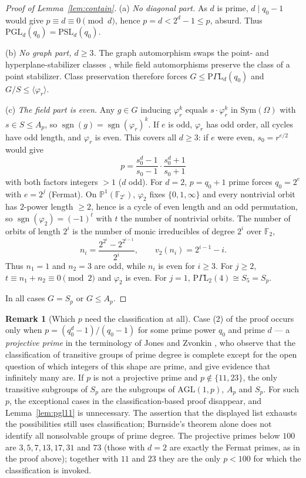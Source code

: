 \documentclass[11pt,a4paper]{amsart}
\newcommand{\PSL}{\mathrm{PSL}}
\newcommand{\PGL}{\mathrm{PGL}}
\newcommand{\PGammaL}{\mathrm{P}\Gamma\mathrm{L}}
\newcommand{\AGL}{\mathrm{AGL}}
\newcommand{\F}{\mathbb{F}}
\newcommand{\sgn}{\operatorname{sgn}}
\theoremstyle{plain}
\theoremstyle{definition}
\newtheorem{remark}[theorem]{Remark}
\begin{document}
\begin{proof}[Proof of Lemma~\ref{lem:contain}]
(a) \emph{No diagonal part.} As \(d\) is prime, \(d\mid q_0-1\) would give \(p\equiv d\equiv0\pmod d\), hence \(p=d<2^d-1\le p\), absurd. Thus \(\PGL_d(q_0)=\PSL_d(q_0)\).

(b) \emph{No graph part, \(d\ge3\).} The graph automorphism swaps the point- and hyperplane-stabilizer classes \cite[\S3.3]{WilsonFSG}, while field automorphisms preserve the class of a point stabilizer. Class preservation therefore forces \(G\le\PGammaL_d(q_0)\) and \(G/S\le\langle\varphi_r\rangle\).

(c) \emph{The field part is even.} Any \(g\in G\) inducing \(\varphi_r^k\) equals \(s\cdot\varphi_r^k\) in \(\mathrm{Sym}(\Omega)\) with \(s\in S\le A_p\), so \(\sgn(g)=\sgn(\varphi_r)^k\). If \(e\) is odd, \(\varphi_r\) has odd order, all cycles have odd length, and \(\varphi_r\) is even. This covers all \(d\ge3\): if \(e\) were even, \(s_0=r^{e/2}\) would give
\[
p=\frac{s_0^d-1}{s_0-1}\cdot\frac{s_0^d+1}{s_0+1}
\]
with both factors integers \(>1\) (\(d\) odd). For \(d=2\), \(p=q_0+1\) prime forces \(q_0=2^e\) with \(e=2^j\) (Fermat). On \(\mathbb P^1(\F_{2^e})\), \(\varphi_2\) fixes \(\{0,1,\infty\}\) and every nontrivial orbit has \(2\)-power length \(\ge2\), hence is a cycle of even length and an odd permutation, so \(\sgn(\varphi_2)=(-1)^t\) with \(t\) the number of nontrivial orbits. The number of orbits of length \(2^i\) is the number of monic irreducibles of degree \(2^i\) over \(\F_2\),
\[
n_i=\frac{2^{2^i}-2^{2^{i-1}}}{2^i},\qquad v_2(n_i)=2^{i-1}-i.
\]
Thus \(n_1=1\) and \(n_2=3\) are odd, while \(n_i\) is even for \(i\ge3\). For \(j\ge2\), \(t\equiv n_1+n_2\equiv0\pmod2\) and \(\varphi_2\) is even. For \(j=1\), \(\PGammaL_2(4)\cong S_5=S_p\).

In all cases \(G=S_p\) or \(G\le A_p\).
\end{proof}

\begin{remark}[Which \(p\) need the classification at all]
\label{rem:projprime}
Case (2) of the proof occurs only when \(p=(q_0^d-1)/(q_0-1)\) for some prime power \(q_0\) and prime \(d\) --- a \emph{projective prime} in the terminology of Jones and Zvonkin \cite{JonesZvonkin}, who observe that the classification of transitive groups of prime degree is complete except for the open question of which integers of this shape are prime, and give evidence that infinitely many are. If \(p\) is not a projective prime and \(p\notin\{11,23\}\), the only transitive subgroups of \(S_p\) are the subgroups of \(\AGL(1,p)\), \(A_p\) and \(S_p\). For such \(p\), the exceptional cases in the classification-based proof disappear, and Lemma~\ref{lem:pgl11} is unnecessary. The assertion that the displayed list exhausts the possibilities still uses classification; Burnside's theorem alone does not identify all nonsolvable groups of prime degree. The projective primes below \(100\) are \(3,5,7,13,17,31\) and \(73\) (those with \(d=2\) are exactly the Fermat primes, as in the proof above); together with \(11\) and \(23\) they are the only \(p<100\) for which the classification is invoked.
\end{remark}
\end{document}
